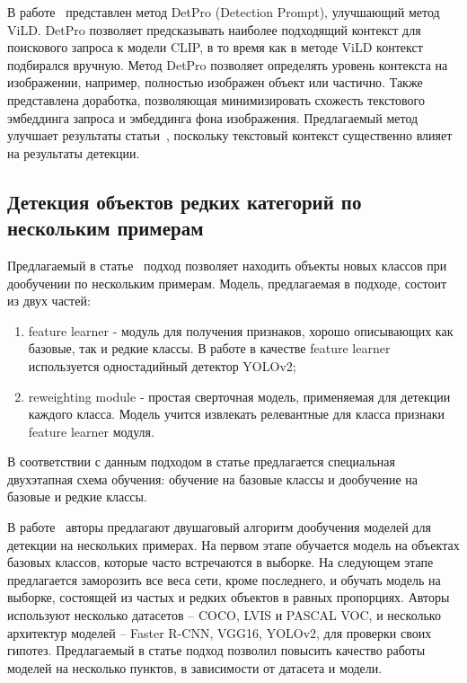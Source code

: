 \documentclass[a4paper,14pt]{article}
\begin{document}
    В работе~\cite{detpro} представлен метод DetPro (Detection Prompt), улучшающий метод ViLD.
    DetPro позволяет предсказывать наиболее подходящий контекст для поискового запроса к модели CLIP, в то время как в методе ViLD контекст подбирался вручную.
    Метод DetPro позволяет определять уровень контекста на изображении, например, полностью изображен объект или частично.
    Также представлена доработка, позволяющая минимизировать схожесть текстового эмбеддинга запроса и эмбеддинга фона изображения.
    Предлагаемый метод улучшает результаты статьи~\cite{ViLD}, поскольку текстовый контекст существенно влияет на результаты детекции.

    \subsection{Детекция объектов редких категорий по нескольким примерам}

    Предлагаемый в статье~\cite{FSODFeatureReweighting} подход позволяет находить объекты новых классов при дообучении по нескольким примерам.
    Модель, предлагаемая в подходе, состоит из двух частей:
    \begin{enumerate}
        [1)]
        \itemsep0em
        \item feature learner - модуль для получения признаков, хорошо описывающих как базовые, так и редкие классы.
        В работе в качестве feature learner используется одностадийный детектор YOLOv2;
        \item reweighting module - простая сверточная модель, применяемая для детекции каждого класса. Модель учится извлекать релевантные для класса признаки feature learner модуля.
    \end{enumerate}
    В соответствии с данным подходом в статье предлагается специальная двухэтапная схема обучения: обучение на базовые классы и дообучение на базовые и редкие классы.

    В работе~\cite{wang2020few} авторы предлагают двушаговый алгоритм дообучения моделей для детекции на нескольких примерах.
    На первом этапе обучается модель на объектах базовых классов, которые часто встречаются в выборке.
    На следующем этапе предлагается заморозить все веса сети, кроме последнего, и обучать модель на выборке, состоящей из частых и редких объектов в равных пропорциях.
    Авторы используют несколько датасетов -- COCO, LVIS и PASCAL VOC,
    и несколько архитектур моделей -- Faster R-CNN, VGG16, YOLOv2, для проверки своих гипотез.
    Предлагаемый в статье подход позволил повысить качество работы моделей на несколько пунктов, в зависимости от датасета и модели.
\end{document}
